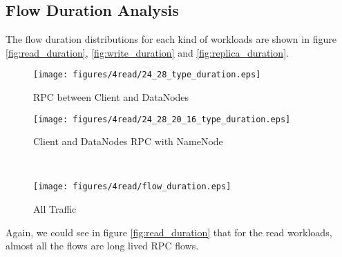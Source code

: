 \subsection{\bf Flow Duration Analysis}
The flow duration distributions for each kind of workloads are shown in figure \ref{fig:read_duration}, \ref{fig:write_duration} and \ref{fig:replica_duration}.

\begin{figure*}[!htpb]
\centering
  \begin{subfigure}[b]{.45\linewidth}
   \centering
	\texttt{[image: figures/4read/24\_28\_type\_duration.eps]} 
	\caption{RPC between Client and DataNodes}\label{fig:read_duration:rpc}
   \end{subfigure}%
  \begin{subfigure}[b]{.45\linewidth}
   \centering
	\texttt{[image: figures/4read/24\_28\_20\_16\_type\_duration.eps]} 
	\caption{Client and DataNodes RPC with NameNode}\label{fig:read_duration:nn_rpc}
   \end{subfigure} \\%
  \begin{subfigure}[b]{.55\linewidth}
   \centering
	\texttt{[image: figures/4read/flow\_duration.eps]}
	\caption{All Traffic}\label{fig:read_duration:all}
   \end{subfigure}%
\caption{Read Flow Duration Distribution}
\label{fig:read_duration}
\end{figure*}

Again, we could see in figure \ref{fig:read_duration} that for the read workloads, almost all the flows are long lived RPC flows.

